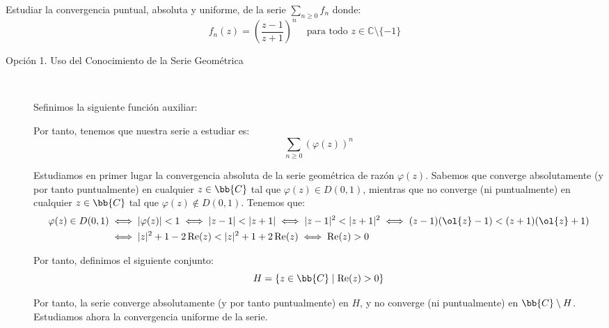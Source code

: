 \begin{ejercicio}
    Estudiar la convergencia puntual, absoluta y uniforme, de la serie $\displaystyle \sum_{n \geq 0} f_n$ donde:
    \[
        f_n(z) = \left(\dfrac{z-1}{z+1}\right)^n \quad \text{para todo } z \in \mathbb{C}\setminus\{-1\}
    \]

    \begin{description}
        \item[Opción 1. Uso del Conocimiento de la Serie Geométrica]~
        
        Sefinimos la siguiente función auxiliar:

        Por tanto, tenemos que nuestra serie a estudiar es:
        \begin{equation*}
            \sum_{n \geq 0} \left(\varphi(z)\right)^n
        \end{equation*}

        Estudiamos en primer lugar la convergencia absoluta de la serie geométrica de razón $\varphi(z)$. Sabemos que converge absolutamente (y por tanto puntualmente) en cualquier $z\in \bb{C}$ tal que $\varphi(z)\in D(0,1)$, mientras que no converge (ni puntualmente) en cualquier $z\in \bb{C}$ tal que $\varphi(z)\notin D(0,1)$. Tenemos que:
        \begin{align*}
            \varphi(z)\in D(0,1) &\iff |\varphi(z)|<1
            \iff |z-1|<|z+1|\iff |z-1|^2<|z+1|^2\iff (z-1)(\ol{z}-1)<(z+1)(\ol{z}+1)\\
            &\iff |z|^2+1 -2\Re(z)<|z|^2+1+2\Re(z)\iff \Re(z)>0
        \end{align*}

        Por tanto, definimos el siguiente conjunto:
        \begin{equation*}
            H = \{z\in \bb{C}\mid \Re(z)>0\}
        \end{equation*}

        Por tanto, la serie converge absolutamente (y por tanto puntualmente) en $H$, y no converge (ni puntualmente) en $\bb{C}\setminus H$.\\

        Estudiamos ahora la convergencia uniforme de la serie.
    \end{description}
\end{ejercicio}